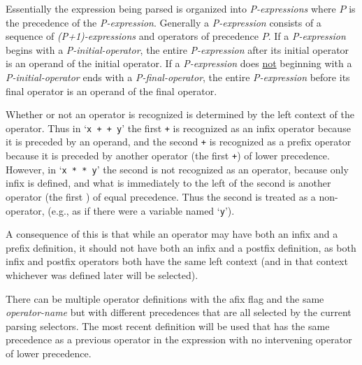 \documentclass[12pt]{article}
\begin{document}
Essentially the expression being parsed is organized into {\em P-expressions}
where $P$ is the precedence of the {\em P-expression}.  Generally
a {\em P-expression} consists of a sequence of {\em (P+1)-expressions}
and operators of precedence $P$.
If a {\em P-expression} begins with a {\em P-initial-operator},
the entire {\em P-expression} after its initial operator is an operand
of the initial operator.
If a {\em P-expression} does \underline{not} beginning
with a {\em P-initial-operator} ends with a {\em P-final-operator},
the entire {\em P-expression} before its final operator is an operand
of the final operator.

Whether or not an operator is recognized is determined by the left
context of the operator.  Thus in `{\tt x + + y}' the first {\tt +}
is recognized as an infix operator because it is preceded by an operand,
and the second {\tt +} is recognized as a prefix operator because it
is preceded by another operator (the first {\tt +}) of lower precedence.
However, in `{\tt x * * y}' the second {\tt *} is not recognized as
an operator, because only infix {\tt *} is defined, and what is immediately
to the left of the second {\tt *} is another operator (the first {\tt *})
of equal precedence.  Thus the second {\tt *} is treated as a non-operator,
(e.g., as if there were a variable named `{\tt * y}').

A consequence of this is that while an operator may have both an
infix and a prefix definition, it should not have both an infix and
a postfix definition, as both infix and postfix operators both have the
same left context (and in that context whichever was defined later will
be selected).

There can be multiple operator definitions with the afix flag
and the same {\em operator-name} but with different precedences
that are all selected by the current parsing selectors.  The most
recent definition will be used that has the same precedence
as a previous operator in the expression with no intervening
operator of lower precedence.
\end{document}
